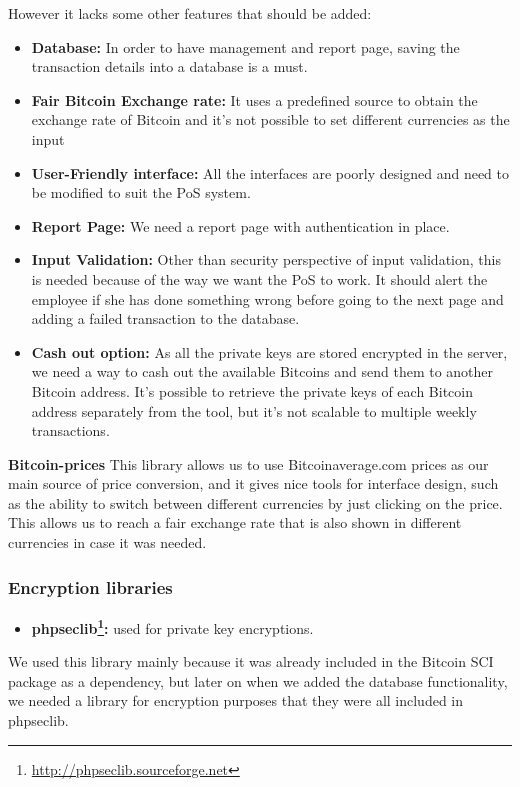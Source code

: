 However it lacks some other features that should be added:
\begin{itemize}

\item \textbf{Database: } In order to have management and report page, saving the transaction details into a database is a must.
\item \textbf{Fair Bitcoin Exchange rate: } It uses a predefined source to obtain the exchange rate of Bitcoin and it's not possible to set different currencies as the input
\item \textbf{User-Friendly interface: } All the interfaces are poorly designed and need to be modified to suit the PoS system.
\item \textbf {Report Page: } We need a report page with authentication in place.
\item \textbf {Input Validation: } Other than security perspective of input validation, this is needed because of the way we want the PoS to work. It should alert the employee if she has done something wrong before going to the next page and adding a failed transaction to the database.
\item \textbf {Cash out option: } As all the private keys are stored encrypted in the server, we need a way to cash out the available Bitcoins and send them to another Bitcoin address. It's possible to retrieve the private keys of each Bitcoin address separately from the tool, but it's not scalable to multiple weekly transactions.
\end{itemize}

\textbf{Bitcoin-prices} This library allows us to use Bitcoinaverage.com prices as our main source of price conversion, and it gives nice tools for interface design, such as the ability to switch between different currencies by just clicking on the price. This allows us to reach a fair exchange rate that is also shown in different currencies in case it was needed.

\subsubsection{Encryption libraries}
\begin{itemize}
\item \textbf{phpseclib\footnote{\url{http://phpseclib.sourceforge.net}}: } used for private key encryptions.
\end{itemize}

We used this library mainly because it was already included in the Bitcoin SCI package as a dependency, but later on when we added the database functionality, we needed a library for encryption purposes that they were all included in phpseclib.

